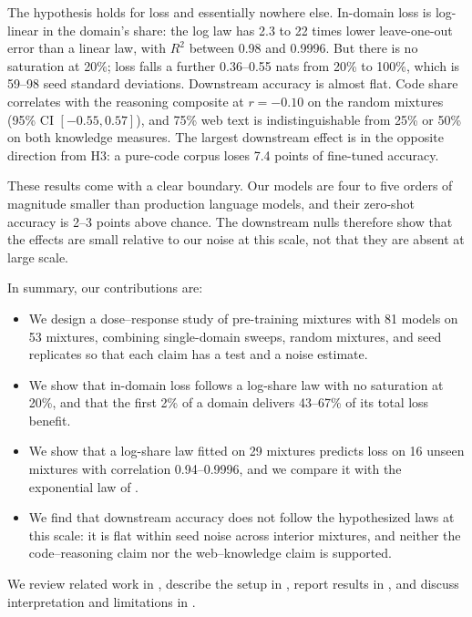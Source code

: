 The hypothesis holds for loss and essentially nowhere else.
In-domain loss is log-linear in the domain's share: the log law has 2.3 to 22 times lower leave-one-out error than a linear law, with $R^2$ between 0.98 and 0.9996.
But there is no saturation at 20\%; loss falls a further 0.36--0.55 nats from 20\% to 100\%, which is 59--98 seed standard deviations.
Downstream accuracy is almost flat.
Code share correlates with the reasoning composite at $r = -0.10$ on the random mixtures (95\% CI $[-0.55, 0.57]$), and 75\% web text is indistinguishable from 25\% or 50\% on both knowledge measures.
The largest downstream effect is in the opposite direction from H3: a pure-code corpus loses 7.4 points of fine-tuned \sciq accuracy.

These results come with a clear boundary.
Our models are four to five orders of magnitude smaller than production language models, and their zero-shot accuracy is 2--3 points above chance.
The downstream nulls therefore show that the effects are small relative to our noise at this scale, not that they are absent at large scale.

In summary, our contributions are:
\begin{itemize}[leftmargin=*,itemsep=0pt,topsep=0pt]
    \item We design a dose--response study of pre-training mixtures with 81 models on 53 mixtures, combining single-domain sweeps, random mixtures, and seed replicates so that each claim has a test and a noise estimate.
    \item We show that in-domain loss follows a log-share law with no saturation at 20\%, and that the first 2\% of a domain delivers 43--67\% of its total loss benefit.
    \item We show that a log-share law fitted on 29 mixtures predicts loss on 16 unseen mixtures with correlation 0.94--0.9996, and we compare it with the exponential law of \citet{ye2025datamixing}.
    \item We find that downstream accuracy does not follow the hypothesized laws at this scale: it is flat within seed noise across interior mixtures, and neither the code--reasoning claim nor the web--knowledge claim is supported.
\end{itemize}

We review related work in , describe the setup in , report results in , and discuss interpretation and limitations in .
